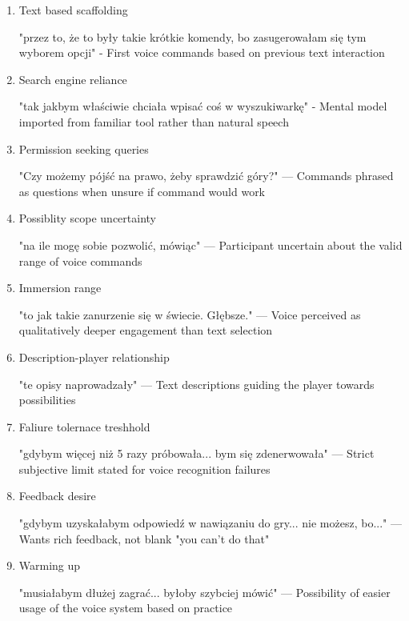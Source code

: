 \begin{enumerate}
    \item Text based scaffolding 
    
    "przez to, że to były takie krótkie komendy, bo zasugerowałam się tym wyborem opcji" - First voice commands based on previous text interaction

    \item Search engine reliance
    
    "tak jakbym właściwie chciała wpisać coś w wyszukiwarkę" - Mental model imported from familiar tool rather than natural speech


    \item Permission seeking queries
    

    "Czy możemy pójść na prawo, żeby sprawdzić góry?" — Commands phrased as questions when unsure if command would work

    \item Possiblity scope uncertainty 
    
    "na ile mogę sobie pozwolić, mówiąc" — Participant uncertain about the valid range of voice commands


    \item Immersion range
    
    "to jak takie zanurzenie się w świecie. Głębsze." — Voice perceived as qualitatively deeper engagement than text selection


    \item Description-player relationship
    
    "te opisy naprowadzały" — Text descriptions guiding the player towards possibilities 


    \item Faliure tolernace treshhold
    
    "gdybym więcej niż 5 razy próbowała... bym się zdenerwowała" — Strict subjective limit stated for voice recognition failures


    \item Feedback desire
    
    "gdybym uzyskałabym odpowiedź w nawiązaniu do gry... nie możesz, bo..." — Wants rich feedback, not blank "you can't do that"


    \item Warming up 
    
    "musiałabym dłużej zagrać... byłoby szybciej mówić" — Possibility of easier usage of the voice system based on practice

\end{enumerate}


